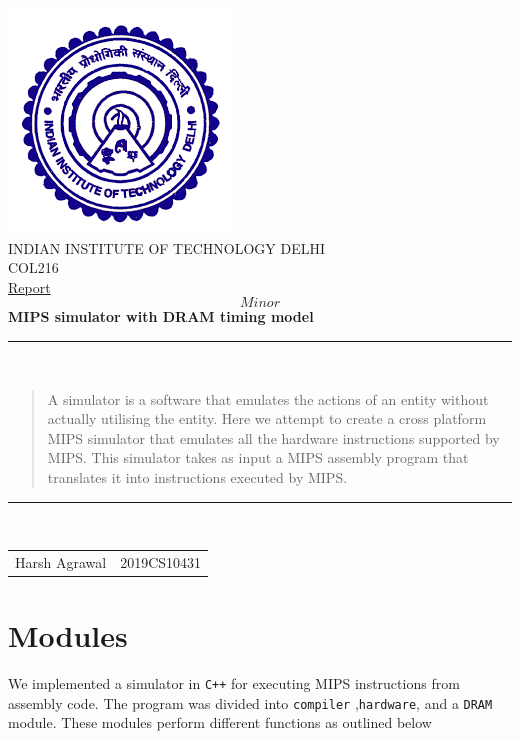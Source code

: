 \documentclass[hidelinks,12pt]{article}
\begin{document}
\begin{titlepage}
    \centering
    \includegraphics[scale=0.5]{../../logo.png}\\[1.0cm]
    \Large INDIAN INSTITUTE OF TECHNOLOGY DELHI\\[1.0 cm]
    \LARGE COL216\\[0.1cm]
    \Large \underline{Report}\\
    \large \[Minor\]
    \LARGE \textbf{MIPS simulator with DRAM timing model}


    \rule{\textwidth}{0.2 mm} \\[0.1cm]
    \begin{abstract}
        A simulator is a software that emulates the actions of an entity without actually utilising the entity.
        Here we attempt to create a cross platform MIPS simulator that emulates all the hardware instructions supported by MIPS.
        This simulator takes as input a MIPS assembly program that translates it into instructions executed by MIPS.
        \\[0.1cm]
    \end{abstract}
    \rule{\textwidth}{0.2 mm} \\[0.1cm]
    \begin{flushright}

        \begin{tabular}{c|c}
            \small {Harsh Agrawal} & \small {2019CS10431} \\
        \end{tabular}
    \end{flushright}
\end{titlepage}
\tableofcontents
\newpage

\section{Modules}
We implemented a simulator in \verb|C++| for executing MIPS instructions from assembly code. The program was divided into \verb|compiler| ,\verb|hardware|, and a \verb|DRAM| module.
These modules perform different functions as outlined below
\end{document}
